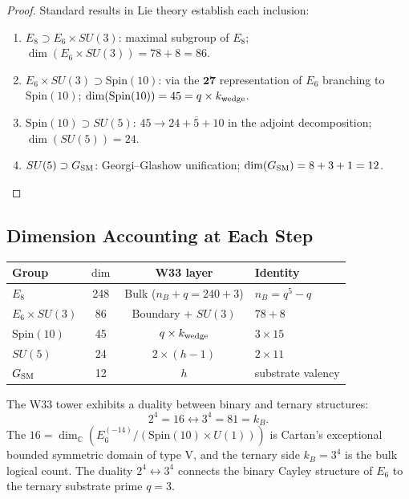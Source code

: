 \begin{proof}
Standard results in Lie theory establish each inclusion:
\begin{enumerate}
\item $E_8 \supset E_6 \times SU(3)$: maximal subgroup of $E_8$;
 $\dim(E_6\times SU(3)) = 78 + 8 = 86$.
\item $E_6 \times SU(3) \supset \mathrm{Spin}(10)$: via the $\mathbf{27}$ representation
 of $E_6$ branching to $\mathrm{Spin}(10)$;
 $\dim(\mathrm{Spin}(10)) = 45 = q \times k_{\rm wedge}$.
\item $\mathrm{Spin}(10) \supset SU(5)$: $45 \to 24 + \overline{5} + 10$
 in the adjoint decomposition; $\dim(SU(5)) = 24$.
\item $SU(5) \supset G_{\rm SM}$: Georgi--Glashow unification;
 $\dim(G_{\rm SM}) = 8+3+1 = 12$.
\end{enumerate}\end{proof}

\subsection{Dimension Accounting at Each Step}

\begin{center}
\renewcommand{\arraystretch}{1.3}
\begin{tabular}{lccl}
\hline
Group & $\dim$ & W33 layer & Identity \\
\hline
$E_8$ & 248 & Bulk ($n_B + q = 240+3$) & $n_B = q^5 - q$ \\
$E_6 \times SU(3)$ & 86 & Boundary + $SU(3)$ & $78 + 8$ \\
$\mathrm{Spin}(10)$ & 45 & $q\times k_{\rm wedge}$ & $3\times 15$ \\
$SU(5)$ & 24 & $2\times(h-1)$ & $2\times 11$ \\
$G_{\rm SM}$ & 12 & $h$ & substrate valency \\
\hline
\end{tabular}
\end{center}

\begin{remark}
The W33 tower exhibits a duality between binary and ternary structures:
\[
2^4 = 16 \longleftrightarrow 3^4 = 81 = k_B.
\]
The $16 = \dim_{\mathbb{C}}(E_6^{(-14)}/(\mathrm{Spin}(10)\times U(1)))$
is Cartan's exceptional bounded symmetric domain of type V,
and the ternary side $k_B = 3^4$ is the bulk logical count.
The duality $2^4 \leftrightarrow 3^4$ connects the binary Cayley
structure of $E_6$ to the ternary substrate prime $q=3$.
\end{remark}

